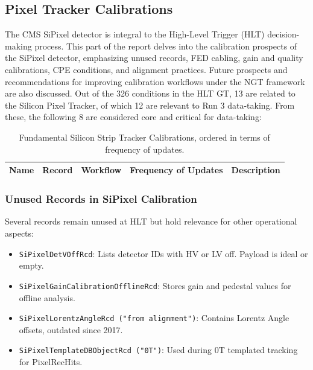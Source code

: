 \subsection{Pixel Tracker Calibrations}

The CMS SiPixel detector is integral to the High-Level Trigger (HLT) decision-making process. This part of the report delves into the calibration prospects of the SiPixel detector, emphasizing unused records, FED cabling, gain and quality calibrations, CPE conditions, and alignment practices. Future prospects and recommendations for improving calibration workflows under the NGT framework are also discussed.
Out of the 326 conditions in the HLT GT, 13 are related to the Silicon Pixel Tracker, of which 12 are relevant to Run 3 data-taking. From these, the following 8 are considered core and critical for data-taking:

\begin{table}[h!]
    \centering
    \begin{adjustbox}{max width=\textwidth}
    \begin{tabular}{p{3.5cm}|p{4cm}|p{2.5cm}|p{2cm}|p{4.5cm}}
        \textbf{Name} & \textbf{Record} & \textbf{Workflow} & \textbf{Frequency of Updates} & \textbf{Description} \\ \hline
    \end{tabular}
    \end{adjustbox}
    \caption{Fundamental Silicon Strip Tracker Calibrations, ordered in terms of frequency of updates.}
    \label{tab:PixelCalibrations_critical}
\end{table}

\subsubsection{Unused Records in SiPixel Calibration}
Several records remain unused at HLT but hold relevance for other operational aspects:
\begin{itemize}
    \item \texttt{SiPixelDetVOffRcd}: Lists detector IDs with HV or LV off. Payload is ideal or empty.
    \item \texttt{SiPixelGainCalibrationOfflineRcd}: Stores gain and pedestal values for offline analysis.
    \item \texttt{SiPixelLorentzAngleRcd ("from alignment")}: Contains Lorentz Angle offsets, outdated since 2017.
    \item \texttt{SiPixelTemplateDBObjectRcd ("0T")}: Used during 0T templated tracking for PixelRecHits.
\end{itemize}

